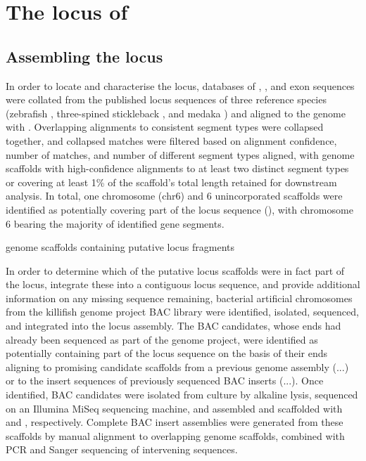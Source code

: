 \section{The \igh{} locus of \nfu}
\label{sec:nfu-locus}

\subsection{Assembling the \Nfu \igh{} locus}
\label{sec:nfu-locus-assembly}

In order to locate and characterise the \nfu \igh{} locus, databases of \vh, \jh, and \ch exon sequences were collated from the published locus sequences of three reference species (zebrafish \parencite{danilova2005zebrafish}, three-spined stickleback \parencite{bao2010stickleback,gambondeza2011stickleback}, and medaka \parencite{magadan2011medaka}) and aligned to the \nfu genome with  \parencite{altschul1990blast,altschul1997blast}. Overlapping alignments to consistent segment types were collapsed together, and collapsed matches were filtered based on alignment confidence, number of matches, and number of different segment types aligned, with genome scaffolds with high-confidence alignments to at least two distinct segment types or covering at least 1\% of the scaffold's total length retained for downstream analysis. In total, one chromosome (chr6) and 6 unincorporated scaffolds were identified as potentially covering part of the locus sequence (), with chromosome 6 bearing the majority of identified gene segments. 

\begin{table}[bh]
\centering
\caption{\Nfu genome scaffolds containing putative \igh{} locus fragments}
\begin{threeparttable}

\end{threeparttable}
\label{tab:nfu-locus-scaffolds}
\end{table}

In order to determine which of the putative locus scaffolds were in fact part of the \igh{} locus, integrate these into a contiguous locus sequence, and provide additional information on any missing sequence remaining, bacterial artificial chromosomes from the killifish genome project BAC library were identified, isolated, sequenced, and integrated into the locus assembly. The BAC candidates, whose ends had already been sequenced as part of the genome project, were identified as potentially containing part of the locus sequence on the basis of their ends aligning to promising candidate scaffolds from a previous genome assembly (...) or to the insert sequences of previously sequenced BAC inserts (...). Once identified,  BAC candidates were isolated from culture by alkaline lysis, sequenced on an Illumina MiSeq sequencing machine, and assembled and scaffolded with  and , respectively. Complete BAC insert assemblies were generated from these scaffolds by manual alignment to overlapping genome scaffolds, combined with PCR and Sanger sequencing of intervening sequences.

